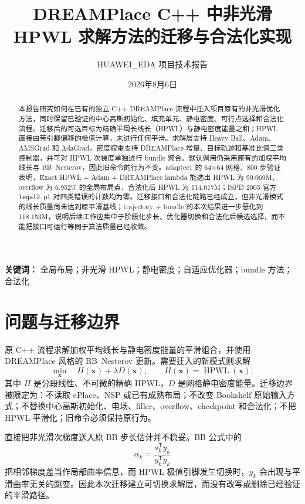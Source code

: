 \documentclass[UTF8,a4paper,11pt]{ctexart}
\title{DREAMPlace C++ 中非光滑 HPWL 求解方法的迁移与合法化实现}
\author{HUAWEI\_EDA 项目技术报告}
\date{2026年8月6日}
\newcommand{\HPWL}{\operatorname{HPWL}}
\begin{document}
\maketitle

\begin{abstract}
本报告研究如何在已有的独立 C++ DREAMPlace 流程中迁入项目原有的非光滑优化方法，同时保留已验证的中心高斯初始化、填充单元、静电密度、可行点选择和合法化流程。迁移后的可选目标为精确半周长线长（HPWL）与静电密度能量之和；HPWL 直接由带引脚偏移的极值计算，未进行任何平滑。求解层支持 Heavy Ball、Adam、AMSGrad 和 AdaGrad，密度权重支持 DREAMPlace 增量、目标轨迹和基准比值三类控制器，并可对 HPWL 次梯度单独进行 bundle 聚合。默认调用仍采用原有的加权平均线长与 BB--Nesterov，因此旧命令的行为不变。adaptec1 的 64\(\times\)64 网格、800 步验证表明，Exact HPWL + Adam + DREAMPlace lambda 能选出 HPWL 为 90.069M、overflow 为 6.952\% 的全局布局点，合法化后 HPWL 为 114.017M；ISPD 2005 官方 \texttt{legal2.pl} 对四类错误的计数均为零。迁移接口和合法化链路已经成立，但非光滑模式的线长质量尚未达到原平滑基线；trajectory + bundle 的本次结果进一步恶化到 118.153M，说明后续工作应集中于阶段化步长、优化器切换和合法化后候选选择，而不能把接口可运行等同于算法质量已经收敛。
\end{abstract}

\noindent\textbf{关键词：} 全局布局；非光滑 HPWL；静电密度；自适应优化器；bundle 方法；合法化

\section{问题与迁移边界}

原 C++ 流程求解加权平均线长与静电密度能量的平滑组合，并使用 DREAMPlace 风格的 BB--Nesterov 更新。需要迁入的新模式则求解
\begin{equation}
  \min_{\boldsymbol{x}}\quad
  H(\boldsymbol{x})+\lambda D(\boldsymbol{x}),
  \qquad H(\boldsymbol{x})=\HPWL(\boldsymbol{x}),
  \label{eq:objective}
\end{equation}
其中 \(H\) 是分段线性、不可微的精确 HPWL，\(D\) 是网格静电密度能量。迁移边界被限定为：不读取 ePlace、NSP 或已有成熟布局；不改变 Bookshelf 原始输入方式；不替换中心高斯初始化、电场、filler、overflow、checkpoint 和合法化；不把 HPWL 平滑化；旧命令必须保持原行为。

直接把非光滑次梯度送入原 BB 步长估计并不稳妥。BB 公式中的
\begin{equation}
  \alpha_k=\frac{s_k^{\mathsf T}y_k}{y_k^{\mathsf T}y_k}
\end{equation}
把相邻梯度差当作局部曲率信息，而 HPWL 极值引脚发生切换时，\(y_k\) 会出现与平滑曲率无关的跳变。因此本次迁移建立可切换求解层，而没有改写或删除已经验证的平滑路径。
\end{document}
